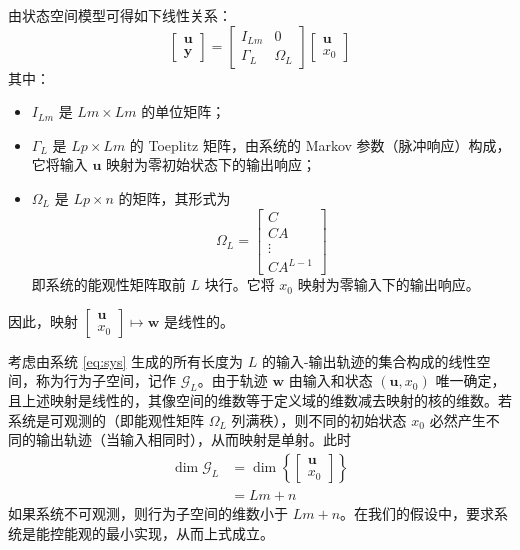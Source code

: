 由状态空间模型可得如下线性关系：
\begin{equation}
	\begin{bmatrix} \mathbf{u} \\ \mathbf{y} \end{bmatrix}
	= \begin{bmatrix} I_{L m} & 0 \\ \Gamma_L & \Omega_L \end{bmatrix}
	\begin{bmatrix} \mathbf{u} \\ x_0 \end{bmatrix}
\end{equation}
其中：
\begin{itemize}
	\item \(I_{L m}\) 是 \(L m \times L m\) 的单位矩阵；
	\item \(\Gamma_L\) 是 \(L p \times L m\) 的 Toeplitz 矩阵，由系统的 Markov 参数（脉冲响应）构成，它将输入 \(\mathbf{u}\) 映射为零初始状态下的输出响应；
	\item \(\Omega_L\) 是 \(L p \times n\) 的矩阵，其形式为
	\[
	\Omega_L = \begin{bmatrix} C \\ C A \\ \vdots \\ C A^{L-1} \end{bmatrix}
	\]
	即系统的能观性矩阵取前 \(L\) 块行。它将 \(x_0\) 映射为零输入下的输出响应。
\end{itemize}
因此，映射 \(\begin{bmatrix} \mathbf{u} \\ x_0 \end{bmatrix} \mapsto \mathbf{w}\) 是线性的。

考虑由系统 \eqref{eq:sys} 生成的所有长度为 \(L\) 的输入-输出轨迹的集合构成的线性空间，称为行为子空间，记作 \(\mathcal{G}_L\)。由于轨迹 $\mathbf{w}$ 由输入和状态 \((\mathbf{u}, x_0)\) 唯一确定，且上述映射是线性的，其像空间的维数等于定义域的维数减去映射的核的维数。若系统是可观测的（即能观性矩阵 \(\Omega_L\) 列满秩），则不同的初始状态 \(x_0\) 必然产生不同的输出轨迹（当输入相同时），从而映射是单射。此时
\begin{equation}
	\begin{aligned}
		\dim \mathcal{G}_L &= \dim \left\{ \begin{bmatrix} \mathbf{u} \\ x_0 \end{bmatrix} \right\} \\
		&= L m + n
	\end{aligned}
\end{equation}
如果系统不可观测，则行为子空间的维数小于 \(L m + n\)。在我们的假设中，要求系统是能控能观的最小实现，从而上式成立。

